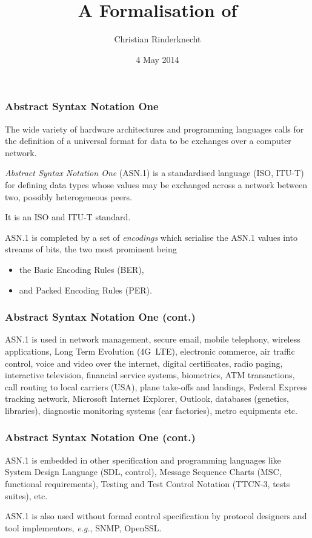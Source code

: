 \documentclass[compress,dvips,xcolor={dvipsnames},t]{beamer}
\title{A Formalisation of \ASN}
\author{Christian Rinderknecht}
\date{4 May 2014}
\newcommand\ASN{\textsf{ASN.1}\xspace}
\begin{document}
\frame{\maketitle}

\begin{frame}
\frametitle{Abstract Syntax Notation One}

The wide variety of hardware architectures and programming languages
calls for the definition of a universal format for data to be
exchanges over a computer network.

\medskip

\emph{Abstract Syntax Notation One} (\ASN) is a standardised language
(ISO, ITU-T) for defining data types whose values may be exchanged
across a network between two, possibly heterogeneous peers.

\medskip

It is an ISO and ITU-T standard.

\medskip

\ASN is completed by a set of \emph{encodings} which serialise the
\ASN values into streams of bits, the two most prominent being
\begin{itemize}

  \item the Basic Encoding Rules (BER),

  \item and Packed Encoding Rules (PER).

\end{itemize}

\end{frame}

\begin{frame}
\frametitle{Abstract Syntax Notation One (cont.)}

\ASN is used in network management, secure email, mobile telephony,
wireless applications, Long Term Evolution (4G~LTE), electronic
commerce, air traffic control, voice and video over the internet,
digital certificates, radio paging, interactive television, financial
service systems, biometrics, ATM transactions, call routing to local
carriers (USA), plane take-offs and landings, Federal Express tracking
network, Microsoft Internet Explorer, Outlook, databases (genetics,
libraries), diagnostic monitoring systems (car factories), metro
equipments etc.

\end{frame}

\begin{frame}
\frametitle{Abstract Syntax Notation One (cont.)}

\ASN is embedded in other specification and programming languages like
System Design Language (SDL, control), Message Sequence Charts (MSC,
functional requirements), Testing and Test Control Notation (TTCN-3,
tests suites), etc.

\medskip

\ASN is also used without formal control specification by protocol
designers and tool implementors, \emph{e.g.}, SNMP, OpenSSL.

\end{frame}
\end{document}
